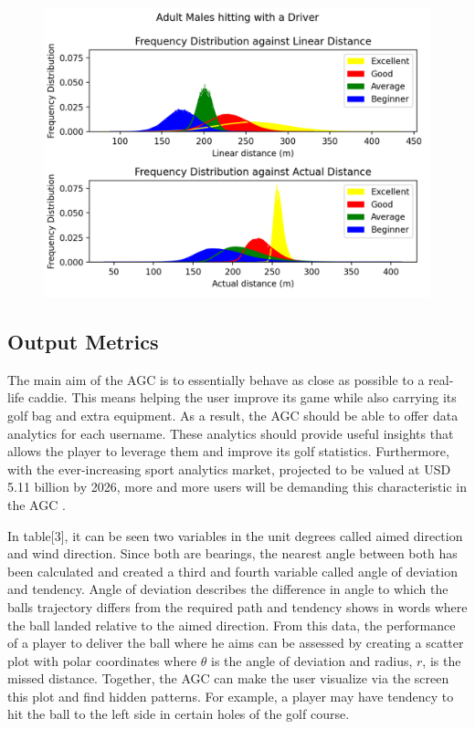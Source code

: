 \documentclass[11pt,landscape]{article}
\begin{document}
\begin{multicols}{3}
\begin{figure}[H]
    \begin{center}
        \includegraphics[]{distribution.png}
        \label{fig:distribution}
    \end{center}
\end{figure}

\subsection{Output Metrics}
The main aim of the AGC is to essentially behave as close as possible to a
real-life caddie. This means helping the user improve its game while also
carrying its golf bag and extra equipment. As a result, the AGC should be able
to offer data analytics for each username. These analytics should provide useful
insights that allows the player to leverage them and improve its golf
statistics. Furthermore, with the ever-increasing sport analytics market,
projected to be valued at USD 5.11 billion by 2026,
more and more users will be demanding this characteristic in the AGC \cite{analytics}. 

In table[3], it can be seen two variables in the unit degrees called aimed
direction and wind direction. Since both are bearings, the nearest angle between
both has been calculated and created a third and fourth variable called angle of
deviation and tendency. Angle of deviation describes the difference in angle to
which the balls trajectory differs from the required path and tendency shows in
words where the ball landed relative to the aimed direction. From this data, the
performance of a player to deliver the ball where he aims can be assessed by
creating a scatter plot with polar coordinates where $\theta$ is the angle of
deviation and radius, $r$, is the missed distance. Together, the AGC can make the
user visualize via the screen this plot and find hidden patterns. For example, a
player may have tendency to hit the ball to the left side in certain holes of
the golf course. 


\end{multicols}
\end{document}
